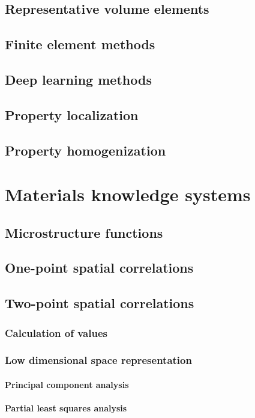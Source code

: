 \subsection{Representative volume elements}
\subsection{Finite element methods}
\subsection{Deep learning methods}
\subsection{Property localization}
\subsection{Property homogenization}

\section{Materials knowledge systems}

\subsection{Microstructure functions}
\subsection{One-point spatial correlations}
\subsection{Two-point spatial correlations}
\subsubsection{Calculation of values}
\subsubsection{Low dimensional space representation}
\paragraph{Principal component analysis}
\paragraph{Partial least squares analysis}

